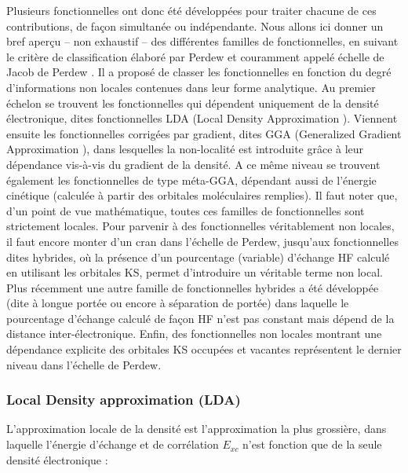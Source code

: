 	Plusieurs fonctionnelles ont donc été développées pour traiter chacune de ces contributions, de façon simultanée ou indépendante. Nous allons ici donner un bref aperçu -- non exhaustif -- des différentes familles de fonctionnelles, en suivant le critère de classification élaboré par Perdew et couramment appelé \og échelle de Jacob de Perdew \fg{}. Il a proposé de classer les fonctionnelles en fonction du degré d’informations non locales contenues dans leur forme analytique. Au premier échelon se trouvent les fonctionnelles qui dépendent uniquement de la densité électronique, dites fonctionnelles LDA (\og Local Density Approximation \fg{}). Viennent ensuite les fonctionnelles corrigées par gradient, dites GGA (\og Generalized Gradient Approximation \fg{}), dans lesquelles la non-localité est introduite grâce à leur dépendance vis-à-vis du gradient de la densité. A ce même niveau se trouvent également les fonctionnelles de type méta-GGA, dépendant aussi de l’énergie cinétique (calculée à partir des orbitales moléculaires remplies). Il faut noter que, d’un point de vue mathématique, toutes ces familles de fonctionnelles sont strictement locales. Pour parvenir à des fonctionnelles véritablement non locales, il faut encore monter d’un cran dans l’échelle de Perdew, jusqu’aux fonctionnelles dites hybrides, où la présence d’un pourcentage (variable) d’échange HF calculé en utilisant les orbitales KS, permet d’introduire un véritable terme non local. Plus récemment une autre famille de fonctionnelles hybrides a été développée (dite à longue portée ou encore à séparation de portée) dans laquelle le pourcentage d’échange calculé de façon HF n’est pas constant mais dépend de la distance inter-électronique. Enfin, des fonctionnelles non locales montrant une dépendance explicite des orbitales KS occupées et vacantes représentent le dernier niveau dans l’échelle de Perdew.
	
	\subsubsection{Local Density approximation (LDA)}\label{lda}
	
	L’approximation locale de la densité est l’approximation la plus grossière, dans laquelle l’énergie d’échange et de corrélation $E_{xc}$ n’est fonction que de la seule densité électronique :
	
